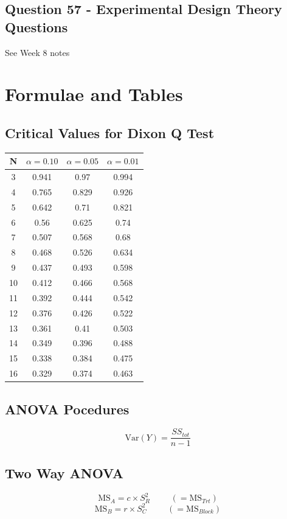 \documentclass[a4paper,12pt]{article}
\begin{document}
\subsection*{Question 57 - Experimental Design Theory Questions}

See Week 8 notes
\newpage
\section*{Formulae and Tables}





\subsection*{Critical Values for Dixon Q Test}
{
	\Large
	\begin{center}
		\begin{tabular}{|c|c|c|c|}
			\hline  N  & $\alpha=0.10$  & $\alpha=0.05$  & $\alpha=0.01$  \\ \hline
			3  & 0.941 & 0.97  & 0.994 \\ \hline
			4  & 0.765 & 0.829 & 0.926 \\ \hline
			5  & 0.642 & 0.71  & 0.821 \\ \hline
			6  & 0.56  & 0.625 & 0.74  \\ \hline
			7  & 0.507 & 0.568 & 0.68  \\ \hline
			8  & 0.468 & 0.526 & 0.634 \\ \hline
			9  & 0.437 & 0.493 & 0.598 \\ \hline
			10 & 0.412 & 0.466 & 0.568 \\ \hline
			11 & 0.392 & 0.444 & 0.542 \\ \hline
			12 & 0.376 & 0.426 & 0.522 \\ \hline
			13 & 0.361 & 0.41  & 0.503 \\ \hline
			14 & 0.349 & 0.396 & 0.488 \\ \hline
			15 & 0.338 & 0.384 & 0.475 \\ \hline
			16 & 0.329 & 0.374 & 0.463 \\ \hline
		\end{tabular} 
	\end{center}
}
\subsection*{ANOVA Pocedures}
\[ \mbox{Var}(Y) = \frac{SS_{tot}}{n-1} \]
\subsection*{Two Way ANOVA}
\[ \textrm{MS}_{A} =  c \times S^2_{R} \phantom{space} (= \textrm{MS}_{Trt} )\]
\[ \textrm{MS}_{B} =  r \times S^2_{C} \phantom{space} (= \textrm{MS}_{Block})\]
\end{document}
